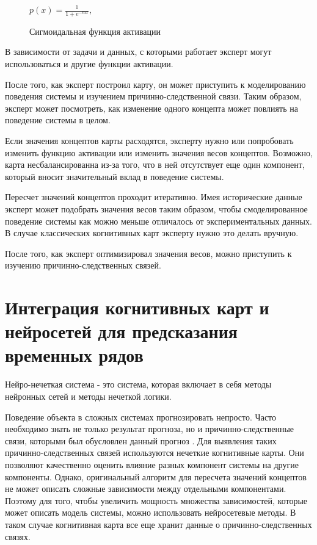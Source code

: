 \begin{figure}[t]
	\centering
	$ p(x) = \frac {1} {1+ e^{-mx} } $,
	\caption{Сигмоидальная функция активации}
	\label{img:sigmiog_actiovation}
\end{figure}
\def\figurename{Рис.}

В зависимости от задачи и данных, с которыми работает эксперт могут использоваться и другие
функции активации.

После того, как эксперт построил карту, он может приступить к моделированию поведения
системы и изучением причинно-следственной связи. Таким образом, эксперт может посмотреть,
как изменение одного концепта может повлиять на поведение системы в целом.

Если значения концептов карты расходятся, эксперту нужно или попробовать изменить функцию
активации или изменить значения весов концептов. Возможно, карта несбалансированна из-за
того, что в ней отсутствует еще один компонент, который вносит значительный вклад в поведение системы.

Пересчет значений концептов проходит итеративно. Имея исторические данные эксперт может
подобрать значения весов таким образом, чтобы смоделированное поведение системы как можно меньше отличалось
от экспериментальных данных. В случае классических когнитивных карт эксперту нужно это делать вручную.

После того, как эксперт оптимизировал значения весов, можно приступить к изучению причинно-следственных
связей.

\section{Интеграция когнитивных карт и нейросетей для предсказания временных рядов}

Нейро-нечеткая система - это система, которая включает в себя методы нейронных сетей и методы нечеткой логики.

Поведение объекта в сложных системах прогнозировать непросто.
Часто необходимо знать не только результат прогноза,
но и причинно-следственные связи, которыми был обусловлен данный прогноз
\cite{osoba2019dags} \cite{efficient_fcms}.
Для выявления таких причинно-следственных связей используются нечеткие когнитивные карты.
Они позволяют качественно оценить влияние разных компонент системы на другие компоненты.
Однако, оригинальный алгоритм для пересчета значений концептов
не может описать сложные зависимости между отдельными компонентами.
Поэтому для того, чтобы увеличить мощность множества зависимостей, которые
может описать модель системы, можно использовать нейросетевые методы.
В таком случае когнитивная карта все еще хранит данные о причинно-следственных связях.

